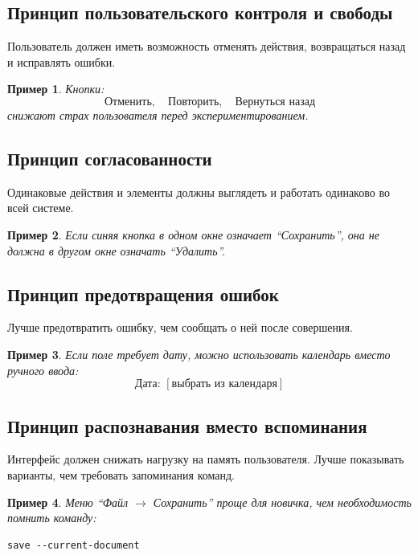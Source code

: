 \documentclass[12pt,a4paper]{article}
\newtheorem{example}{Пример}
\begin{document}
\subsection{Принцип пользовательского контроля и свободы}

Пользователь должен иметь возможность отменять действия, возвращаться назад и исправлять ошибки.

\begin{example}
Кнопки:
\[
\text{Отменить}, \quad \text{Повторить}, \quad \text{Вернуться назад}
\]
снижают страх пользователя перед экспериментированием.
\end{example}

\subsection{Принцип согласованности}

Одинаковые действия и элементы должны выглядеть и работать одинаково во всей системе.

\begin{example}
Если синяя кнопка в одном окне означает ``Сохранить'', она не должна в другом окне означать ``Удалить''.
\end{example}

\subsection{Принцип предотвращения ошибок}

Лучше предотвратить ошибку, чем сообщать о ней после совершения.

\begin{example}
Если поле требует дату, можно использовать календарь вместо ручного ввода:
\[
\text{Дата: } [\text{выбрать из календаря}]
\]
\end{example}

\subsection{Принцип распознавания вместо вспоминания}

Интерфейс должен снижать нагрузку на память пользователя. Лучше показывать варианты, чем требовать запоминания команд.

\begin{example}
Меню ``Файл $\rightarrow$ Сохранить'' проще для новичка, чем необходимость помнить команду:
\begin{lstlisting}
save --current-document
\end{lstlisting}
\end{example}
\end{document}
